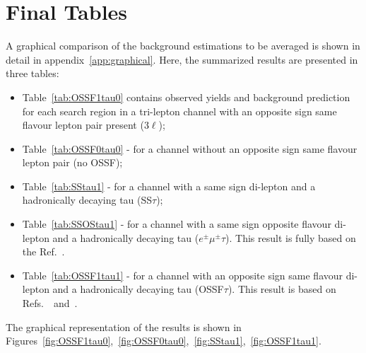 \section{Final Tables}
A graphical comparison of the background estimations to be averaged is shown in detail in appendix~\ref{app:graphical}. 
Here, the summarized results are presented in three tables: 
\begin{itemize}
\item Table~\ref{tab:OSSF1tau0} contains observed yields  and background prediction 
for each search region in a tri-lepton channel with an opposite sign same flavour lepton pair present (3$\ell$);
\item Table~\ref{tab:OSSF0tau0}  - for a channel without  an opposite sign same flavour lepton pair (no OSSF);
\item Table~\ref{tab:SStau1} - for a channel with a same sign di-lepton and a hadronically decaying tau (SS$\tau$);
\item Table~\ref{tab:SSOStau1} - for a channel with a same sign opposite flavour di-lepton and a hadronically decaying tau ($e^\pm\mu^\pm\tau$). This result is fully based on the Ref.~\cite{AN2012:255}.
\item Table~\ref{tab:OSSF1tau1} - for a channel with an opposite sign same flavour di-lepton and a hadronically decaying tau (OSSF$\tau$). This result is   based on Refs.~\cite{AN2012:255}~and~\cite{AN2012:256}.
\end{itemize}

The graphical representation of the results is shown in Figures~\ref{fig:OSSF1tau0},~\ref{fig:OSSF0tau0},~\ref{fig:SStau1},~\ref{fig:OSSF1tau1}.

